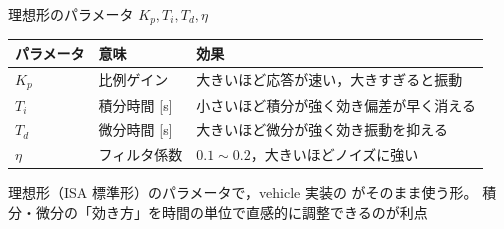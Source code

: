 \begin{frame}{理想形のパラメータ $K_p,T_i,T_d,\eta$\later}
  \begin{table}
    \centering\footnotesize
    \begin{tabular}{ll >{\raggedright\arraybackslash}p{58mm}}
      \hline
      \textbf{パラメータ} & \textbf{意味} & \textbf{効果} \\
      \hline
      $K_p$  & 比例ゲイン   & 大きいほど応答が速い，大きすぎると振動 \\
      $T_i$  & 積分時間 [s] & 小さいほど積分が強く効き偏差が早く消える \\
      $T_d$  & 微分時間 [s] & 大きいほど微分が強く効き振動を抑える \\
      $\eta$ & フィルタ係数  & $0.1\sim0.2$，大きいほどノイズに強い \\
      \hline
    \end{tabular}
  \end{table}

  \vspace{0.5em}

  {\footnotesize 理想形（ISA 標準形）のパラメータで，vehicle 実装の  がそのまま使う形。
  積分・微分の「効き方」を時間の単位で直感的に調整できるのが利点}
\end{frame}

